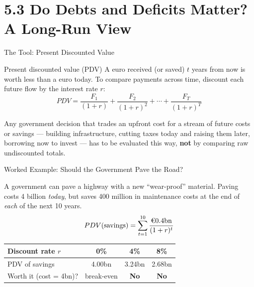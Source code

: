 \documentclass[11pt,aspectratio=169]{beamer}
\begin{document}
\section{5.3 Do Debts and Deficits Matter? A Long-Run View}

\begin{frame}{The Tool: Present Discounted Value}
  \begin{block}{Present discounted value (PDV)}
    A euro received (or saved) $t$ years from now is worth less than a euro today. To compare payments across time, discount each future flow by the interest rate $r$:
    \[
      PDV = \frac{F_1}{(1+r)} + \frac{F_2}{(1+r)^2} + \cdots + \frac{F_T}{(1+r)^T}
    \]
  \end{block}
  \vspace{0.3em}
  Any government decision that trades an upfront cost for a stream of future costs or savings --- building infrastructure, cutting taxes today and raising them later, borrowing now to invest --- has to be evaluated this way, \textbf{not} by comparing raw undiscounted totals.
\end{frame}

\begin{frame}{Worked Example: Should the Government Pave the Road?}

  A government can pave a highway with a new ``wear-proof'' material. Paving costs \texteuro{}4 billion \emph{today}, but saves \texteuro{}400 million in maintenance costs at the end of \emph{each} of the next 10 years.
  \vspace{0.3em}
  \[
    PDV(\text{savings}) = \sum_{t=1}^{10} \frac{\text{\texteuro}0.4\text{bn}}{(1+r)^t}
  \]
  \begin{center}
  \begin{tabular}{@{}lccc@{}}
    \toprule
    Discount rate $r$ & 0\% & 4\% & 8\% \\
    \midrule
    PDV of savings & \texteuro{}4.00bn & \texteuro{}3.24bn & \texteuro{}2.68bn \\
    Worth it (cost = \texteuro{}4bn)? & break-even & \textbf{No} & \textbf{No} \\
    \bottomrule
  \end{tabular}
  \end{center}
  
\end{frame}
\end{document}
